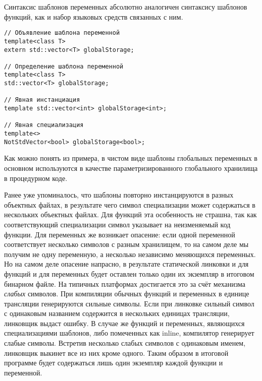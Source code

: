 Синтаксис шаблонов переменных абсолютно аналогичен синтаксису шаблонов функций, как и набор языковых средств связанных с ним.
\begin{verbatim}
// Объявление шаблона переменной
template<class T>
extern std::vector<T> globalStorage;

// Определение шаблона переменной
template<class T>
std::vector<T> globalStorage;

// Явная инстанциация
template std::vector<int> globalStorage<int>;

// Явная специализация
template<>
NotStdVector<bool> globalStorage<bool>;
\end{verbatim}

Как можно понять из примера, в чистом виде шаблоны глобальных переменных в основном используются в качестве параметризированного глобального хранилища в процедурном коде.

Ранее уже упоминалось, что шаблоны повторно инстанцируются в разных объектных файлах, в результате чего символ специализации может содержаться в нескольких объектных файлах.
Для функций эта особенность не страшна, так как соответствующий специализации символ указывает на неизменяемый код функции.
Для переменных же возникает опасение: если одной переменной соответствует несколько символов с разным хранилищем, то на самом деле мы получим не одну переменную, а несколько независимо меняющихся переменных.
Но на самом деле опасение напрасно, в результате статической линковки и для функций и для переменных будет оставлен только один их экземпляр в итоговом бинарном файле.
На типичных платформах достигается это за счёт механизма \textit{слабых} символов.
При компиляции обычных функций и переменных в единице трансляции генерируются сильные символы.
Если при линковке сильный символ с одинаковым названием содержится в нескольких единицах трансляции, линковщик выдаст ошибку.
В случае же функций и переменных, являющихся специализациями шаблонов, либо помеченных как inline, компилятор генерирует слабые символы.
Встретив несколько слабых символов с одинаковым именем, линковщик выкинет все из них кроме одного.
Таким образом в итоговой программе будет содержаться лишь один экземпляр каждой функции и переменной.

